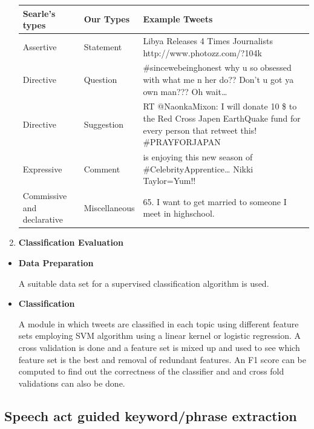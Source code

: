 \documentclass[conference]{IEEEtran}
\begin{document}
\begin{enumerate}
\begin{table}[!ht]
    \begin{small}
    \begin{tabular}{|p{1.5cm}|p{1.8cm}|p{4cm}|}
    \hline {\bfseries Searle's types} & {\bfseries Our Types} &{\bfseries Example Tweets} \\
    \hline
     Assertive &  Statement & Libya Releases 4 Times Journalists http://www.photozz.com/?104k\\
     \hline
     Directive & Question & #sincewebeinghonest why u so obsessed with what me n her do?? Don’t u got ya own man??? Oh wait… \\
     \hline
     Directive & Suggestion & RT @NaonkaMixon: I will donate 10 \$ to the Red Cross Japen EarthQuake fund for every person that retweet this! #PRAYFORJAPAN \\
     \hline
     Expressive & Comment & is enjoying this new season of #CelebrityApprentice… Nikki Taylor=Yum!! \\
     \hline
     Commissive and declarative & Miscellaneous & 65. I want to get married to someone I meet in highschool. #100factsaboutme \\
     \hline
    \end{tabular}
    \end{small} 
\end{table}


\item{\textbf{Classification Evaluation}}
\end{enumerate}

\begin{itemize}

\item{\textbf{Data Preparation}}
\par A suitable data set for a supervised classification algorithm is used.

\item{\textbf{Classification}}
\par A module in which tweets are classified in each topic using different feature sets employing SVM algorithm  using a linear kernel or logistic regression. A cross validation is done and a feature set is mixed up and used to see which feature set is the best and removal of redundant  features. An F1 score can be computed to find out the correctness of the classifier and and cross fold validations can also be done.
\end{itemize}

\subsection{\textbf{Speech act guided keyword/phrase extraction}}
\end{document}
